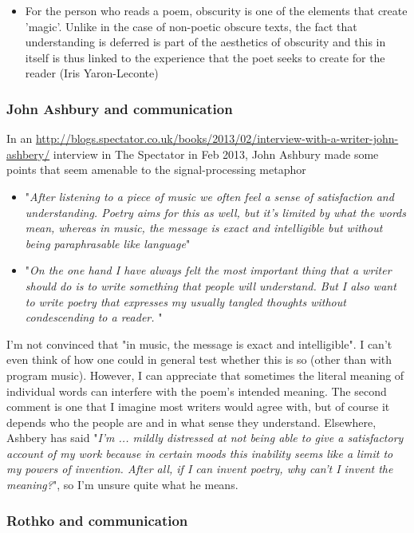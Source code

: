 \documentclass[11pt]{article}
\begin{document}
\begin{itemize}
\item For the person who reads a poem, obscurity is one of the elements that create 'magic'. Unlike in the case of non-poetic obscure texts, the fact that understanding is deferred is part of the aesthetics of obscurity and this in itself is thus linked to the experience that the poet seeks to create for the reader (Iris Yaron-Leconte)

\end{itemize}

\subsubsection*{John Ashbury and communication} 

In an \url{http://blogs.spectator.co.uk/books/2013/02/interview-with-a-writer-john-ashbery/} interview in The Spectator in Feb 2013, John Ashbury made some points that seem amenable to the signal-processing metaphor
\begin{itemize}
\item "\textit{After listening to a piece of music we often feel a sense of satisfaction and understanding. Poetry aims for this as well, but it's limited by what the words mean, whereas in music, the message is exact and intelligible but without being paraphrasable like language}"
\item "\textit{On the one hand I have always felt the most important thing that a writer should do is to write something that people will understand. But I also want to write poetry that expresses my usually tangled thoughts without condescending to a reader. }"
\end{itemize}

I'm not convinced that "in music, the message is exact and intelligible". I can't even think of how one could in general test whether this is so (other than with program music). However, I can appreciate that sometimes the literal meaning of individual words can interfere with the poem's intended meaning. The second comment is one that I imagine most writers would agree with, but of course it depends who the people are and in what sense they understand. Elsewhere, Ashbery has said "\textit{I'm ... mildly distressed at not being able to give a satisfactory account of my work because in certain moods this inability seems like a limit to my powers of invention. After all, if I can invent poetry, why can't I invent the meaning?}", so I'm unsure quite what he means.


\subsubsection*{Rothko and communication} 
\end{document}
